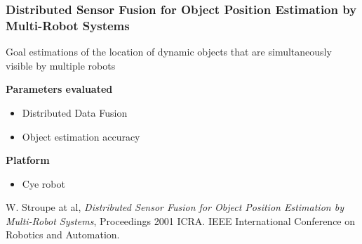 \begin{frame}
	\frametitle{Distributed Sensor Fusion for Object Position Estimation by Multi-Robot Systems}
	
	\normalsize
	
	\vspace{0.3cm}
	
	\begin{block}{Goal}
		estimations of the location of dynamic objects that are simultaneously visible by multiple robots
	\end{block}
	
	\vspace{0.15cm}
	
	\textbf{Parameters evaluated}
	
	\begin{itemize}
		\item Distributed Data Fusion
		
		\item Object estimation accuracy
	\end{itemize}
	
	\textbf{Platform}
	
	\begin{itemize}
		\item Cye robot
	\end{itemize}
	
	\vspace{-3.7cm}
	
	\begin{tabbing}
		\hspace{7cm}
		
	\end{tabbing}
	
	\vspace{-0.5cm}
	
	\tiny
	W. Stroupe at al, \emph{Distributed Sensor Fusion for Object Position Estimation by Multi-Robot Systems},
	\vspace{-0.35cm}
	Proceedings 2001 ICRA. IEEE International Conference on Robotics and Automation.
\end{frame}

